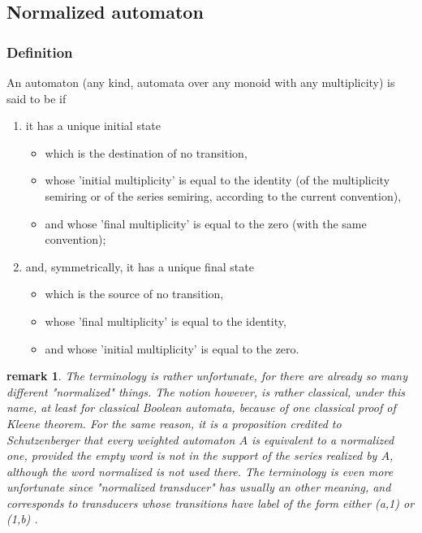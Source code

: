 \documentclass[a4paper]{report}
\newtheorem{remark}     [theorem]{remark}
\begin{document}
\subsection{Normalized automaton}

\subsubsection{Definition}


An automaton (any kind, automata over any monoid with any
multiplicity) is said to be  if

\begin{enumerate}
\item it has a unique initial state
  \begin{itemize}
  \item which is the destination of no transition,
  \item whose 'initial multiplicity' is equal to the identity (of the
    multiplicity semiring or of the series semiring, according to the
    current convention),
  \item and whose 'final multiplicity' is equal to the zero (with the
    same convention);
  \end{itemize}

\item and, symmetrically, it has a unique final state
  \begin{itemize}
  \item which is the source of no transition,
  \item whose 'final multiplicity' is equal to the identity,
  \item and whose 'initial multiplicity' is equal to the zero.
  \end{itemize}
\end{enumerate}

\begin{remark}
  The terminology is rather unfortunate, for there are already so many
  different "normalized" things. The notion however, is rather
  classical, under this name, at least for classical Boolean
  automata, because of one classical proof of Kleene theorem. For the
  same reason, it is a proposition credited to Schutzenberger that
  every weighted automaton $A$ is equivalent to a normalized one,
  provided the empty word is not in the support of the series realized
  by $A$, although the word normalized is not used there. The
  terminology is even more unfortunate since "normalized transducer"
  has usually an other meaning, and corresponds to transducers whose
  transitions have label of the form either (a,1) or (1,b) .
\end{remark}
\end{document}
